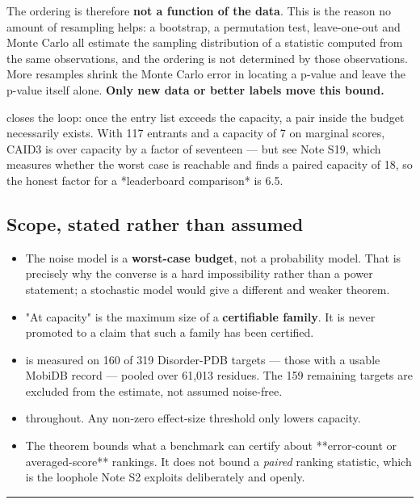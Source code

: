The ordering is therefore \textbf{not a function of the data}. This is the reason no
amount of resampling helps: a bootstrap, a permutation test, leave-one-out and
Monte Carlo all estimate the sampling distribution of a statistic computed from
the same observations, and the ordering is not determined by those observations.
More resamples shrink the Monte Carlo error in locating a p-value and leave the
p-value itself alone. \textbf{Only new data or better labels move this bound.}

 closes the loop: once the entry list exceeds the
capacity, a pair inside the budget necessarily exists. With 117 entrants and a
capacity of 7 on marginal scores, CAID3 is over capacity by a factor of
seventeen --- but see Note S19, which measures whether the worst case is reachable
and finds a paired capacity of 18, so the honest factor for a *leaderboard
comparison* is 6.5.


\subsection*{Scope, stated rather than assumed}

\begin{itemize}\itemsep1pt \parskip0pt
\item The noise model is a \textbf{worst-case budget}, not a probability model. That is
  precisely why the converse is a hard impossibility rather than a power
  statement; a stochastic model would give a different and weaker theorem.
\item "At capacity" is the maximum size of a \textbf{certifiable family}. It is never
  promoted to a claim that such a family has been certified.
\item {} is measured on 160 of 319 Disorder-PDB targets --- those with a
  usable MobiDB record --- pooled over 61,013 residues. The 159 remaining targets
  are excluded from the estimate, not assumed noise-free.
\item {} throughout. Any non-zero effect-size threshold only lowers capacity.
\item The theorem bounds what a benchmark can certify about **error-count or
  averaged-score** rankings. It does not bound a \emph{paired} ranking statistic,
  which is the loophole Note S2 exploits deliberately and openly.
\end{itemize}


\vspace{0.5em}\hrule\vspace{0.8em}



